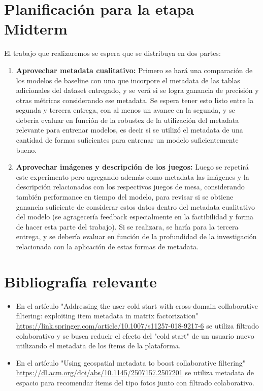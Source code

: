 \documentclass[11pt]{article}
\begin{document}
\section{Planificación para la etapa Midterm} 
El trabajo que realizaremos se espera que se distribuya en dos partes:
\begin{enumerate}
    \item \textbf{Aprovechar metadata cualitativo:} Primero se hará una comparación de los modelos de baseline con uno que incorpore el metadata de las tablas adicionales del dataset entregado, y se verá si se logra ganancia de precisión y otras métricas considerando ese metadata. Se espera tener esto listo entre la segunda y tercera entrega, con al menos un avance en la segunda, y se debería evaluar en función de la robustez de la utilización del metadata relevante para entrenar modelos, es decir si se utilizó el metadata de una cantidad de formas suficientes para entrenar un modelo suficientemente bueno.
    \item \textbf{Aprovechar imágenes y descripción de los juegos:} Luego se repetirá este experimento pero agregando además como metadata las imágenes y la descripción relacionados con los respectivos juegos de mesa, considerando también performance en tiempo del modelo, para revisar si se obtiene ganancia suficiente de considerar estos datos dentro del metadata cualitativo del modelo (se agragecería feedback especialmente en la factibilidad y forma de hacer esta parte del trabajo). Si se realizara, se haría para la tercera entrega, y se debería evaluar en función de la profundidad de la investigación relacionada con la aplicación de estas formas de metadata.
\end{enumerate}


\section{Bibliografía relevante}

\begin{itemize}
    \item En el artículo "Addressing the user cold start with cross-domain collaborative filtering: exploiting item metadata in matrix factorization" \url{https://link.springer.com/article/10.1007/s11257-018-9217-6} se utiliza filtrado colaborativo y se busca reducir el efecto del "cold start" de un usuario nuevo utilizando el metadata de los ítems de la plataforma.
    \item En el artículo "Using geospatial metadata to boost collaborative filtering" \url{https://dl.acm.org/doi/abs/10.1145/2507157.2507201} se utiliza metadata de espacio para recomendar ítems del tipo fotos junto con filtrado colaborativo.
\end{itemize}
\end{document}
